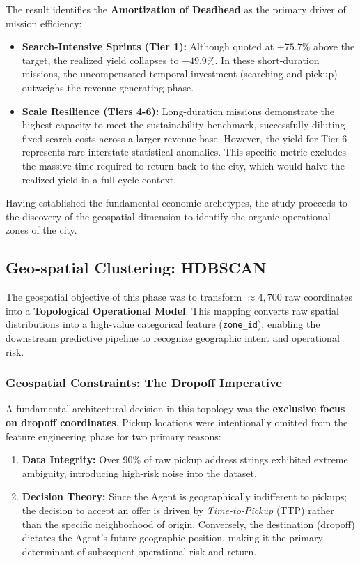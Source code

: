 The result identifies the \textbf{Amortization of Deadhead} as the primary driver of mission efficiency:
\begin{itemize}[noitemsep, topsep=3pt]
    \item \textbf{Search-Intensive Sprints (Tier 1):} Although quoted at $+75.7\%$ above the target, the realized yield collapses to $-49.9\%$. In these short-duration missions, the uncompensated temporal investment (searching and pickup) outweighs the revenue-generating phase.
    \item \textbf{Scale Resilience (Tiers 4-6):} Long-duration missions demonstrate the highest capacity to meet the sustainability benchmark, successfully diluting fixed search costs across a larger revenue base. However, the yield for Tier 6 represents rare interstate statistical anomalies. This specific metric excludes the massive time required to return back to the city, which would halve the realized yield in a full-cycle context.
\end{itemize}


 \noindent Having established the fundamental economic archetypes, the study proceeds to the discovery of the geospatial dimension to identify the organic operational zones of the city.

\subsection{Geo-spatial Clustering: HDBSCAN}
The geospatial objective of this phase was to transform $\approx 4,700$ raw coordinates into a \textbf{Topological Operational Model}. This mapping converts raw spatial distributions into a high-value categorical feature (\texttt{zone\_id}), enabling the downstream predictive pipeline to recognize geographic intent and operational risk.

\subsubsection{Geospatial Constraints: The Dropoff Imperative}
A fundamental architectural decision in this topology was the \textbf{exclusive focus on dropoff coordinates}. Pickup locations were intentionally omitted from the feature engineering phase for two primary reasons:
\begin{enumerate}[noitemsep, topsep=3pt]
    \item \textbf{Data Integrity:} Over 90\% of raw pickup address strings exhibited extreme ambiguity, introducing high-risk noise into the dataset.
    \item \textbf{Decision Theory:} Since the Agent is geographically indifferent to pickups; the decision to accept an offer is driven by \textit{Time-to-Pickup} (TTP) rather than the specific neighborhood of origin. Conversely, the destination (dropoff) dictates the Agent's future geographic position, making it the primary determinant of subsequent operational risk and return.
\end{enumerate}

